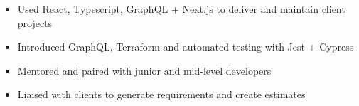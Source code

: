 \bigbreak
\begin{itemize}
    \item Used React, Typescript, GraphQL + Next.js to deliver and maintain client projects
    \item Introduced GraphQL, Terraform and automated testing with Jest + Cypress
    \item Mentored and paired with junior and mid-level developers
    \item Liaised with clients to generate requirements and create estimates
\end{itemize}
